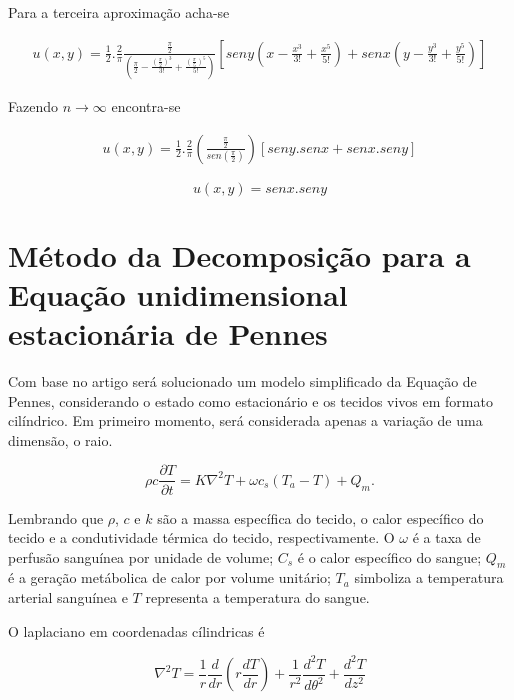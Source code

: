 Para a terceira aproximação acha-se


\begin{gather}
u(x,y) = \frac{1}{2}.\frac{2}{\pi}\frac{\frac{\pi}{2}}{\left(\frac{\pi}{2}-\frac{(\frac{\pi}{2})^3}{3!} + \frac{(\frac{\pi}{5})^5}{5!}\right)}\left[seny\left(x - \frac{x^3}{3!} + \frac{x^5}{5!}\right) + senx\left( y - \frac{y^3}{3!} + \frac{y^5}{5!}\right)\right]
\end{gather}

Fazendo $n\rightarrow \infty$ encontra-se

\begin{gather}
u(x,y) = \frac{1}{2}.\frac{2}{\pi}\left(\frac{\frac{\pi}{2}}{sen(\frac{\pi}{2})}\right)\left[seny.senx + senx.seny\right]
\end{gather}

\begin{displaymath}
u(x,y) = senx.seny
\end{displaymath}





\chapter[Método da Decomposição para a  equação unidimensional estacionária de Pennes]{Método da Decomposição para a  Equação unidimensional estacionária de Pennes}



Com base no artigo \cite{Equacao} será solucionado um modelo simplificado da Equação de Pennes, considerando o estado como estacionário e os tecidos vivos em formato cilíndrico. Em primeiro momento, será considerada apenas a variação de uma dimensão, o raio. 


  \begin{equation}\rho c\frac{\partial T}{\partial t} = K\nabla^{2}T+\omega c_{s} (T_{a}- T) + Q_{m} . \end{equation}
  
  Lembrando que $\rho$, $c$ e $k$ são a massa específica do tecido, o calor específico do tecido e a condutividade térmica do tecido, respectivamente. O $\omega$ é a taxa de perfusão sanguínea por unidade de volume; $C_{s}$ é o  calor específico do sangue; $Q_{m}$ é a geração metábolica de calor por volume unitário; $T_{a}$ simboliza a temperatura arterial sanguínea e $T$ representa a temperatura do sangue.

 O laplaciano em coordenadas cílindricas é
 
 \begin{equation}\nabla^{2}T = \frac{1}{r}\frac{d}{dr}\left(r\frac{dT}{dr}\right) + \frac{1}{r^{2}}\frac{d^{2}T}{d\theta^{2}} + \frac{d^{2}T}{dz^{2}}\end{equation}
 
